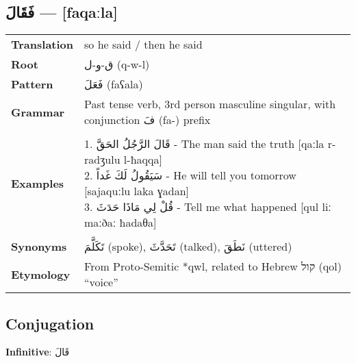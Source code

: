 \documentclass[letter,12pt]{article}
\begin{document}
\subsection{\textarabic{فَقَالَ} — [faqaːla]}
\begin{tabular}{p{3cm}p{10cm}}
\toprule

\textbf{Translation} & so he said / then he said \\
\textbf{Root} & \textarabic{ق-و-ل} (q-w-l) \\
\textbf{Pattern} & \textarabic{فَعَلَ} (faʕala) \\
\textbf{Grammar} & Past tense verb, 3rd person masculine singular, with conjunction \textarabic{فَ} (fa-) prefix \\
\midrule \\
\textbf{Examples} & \makecell[l]{\parbox{9.5cm}{
1. \textarabic{قَالَ الرَّجُلُ الحَقَّ} - The man said the truth [qaːla r-radʒulu l-ħaqqa]\\
2. \textarabic{سَيَقُولُ لَكَ غَداً} - He will tell you tomorrow [sajaquːlu laka ɣadan]\\
3. \textarabic{قُلْ لِي مَاذَا حَدَثَ} - Tell me what happened [qul liː maːðaː ħadaθa]
} } \\
\midrule \\
\textbf{Synonyms} & \textarabic{تَكَلَّمَ} (spoke), \textarabic{تَحَدَّثَ} (talked), \textarabic{نَطَقَ} (uttered) \\
\textbf{Etymology} & From Proto-Semitic *qwl, related to Hebrew \texthebrew{קול} (qol) ``voice'' \\
\bottomrule
\end{tabular}

\subsection{Conjugation}
\large \textbf{Infinitive}: \textarabic{قَالَ}
\end{document}
